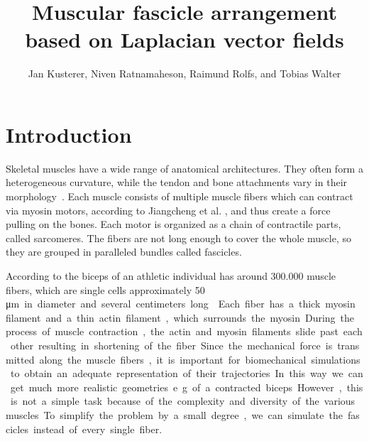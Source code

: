 \documentclass[preprint,journal]{vgtc}       %
\title{Muscular fascicle arrangement based on Laplacian vector fields}
\author{Jan Kusterer, Niven Ratnamaheson, Raimund Rolfs, and Tobias Walter}
\begin{document}
\maketitle

\section{Introduction}\label{sec:intro}
Skeletal muscles have a wide range of anatomical architectures. 
They often form a heterogeneous curvature, while the tendon and bone attachments vary in their morphology~\cite{Choi2013}. 
Each muscle consists of multiple muscle fibers which can contract via myosin motors, according to Jiangcheng et al. 
\cite{Jiangcheng2015}, and thus create a force pulling on the bones. 
Each motor is organized as a chain of contractile parts, called sarcomeres. 
The fibers are not long enough to cover the whole muscle, so they are grouped in paralleled bundles called fascicles. 

According to \cite{Etemadi.et.Al.} the biceps of an athletic individual has around 300.000 muscle fibers, which are single cells approximately 50 \si\micro m in diameter and several centimeters long \cite{Cooper2000}. 
Each fiber has a thick myosin filament and a thin actin filament, which surrounds the myosin. 
During the process of muscle contraction, the actin and myosin filaments slide past each other resulting in shortening of the fiber.

Since the mechanical force is transmitted along the muscle fibers, it is important for biomechanical simulations to obtain an adequate representation of their trajectories. 
In this way we can get much more realistic geometries e.g. of a contracted biceps.
However, this is not a simple task because of the complexity and diversity of the various muscles. 
To simplify the problem by a small degree, we can simulate the fascicles instead of every single fiber.
\end{document}
